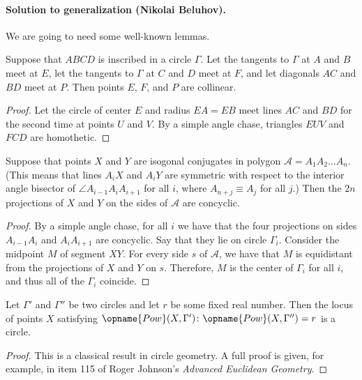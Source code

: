 \paragraph{Solution to generalization (Nikolai Beluhov).}
We are going to need some well-known lemmas.

\begin{lemma*}
Suppose that $ABCD$ is inscribed in a circle $\Gamma$.
Let the tangents to $\Gamma$ at $A$ and $B$ meet at $E$,
let the tangents to $\Gamma$ at $C$ and $D$ meet at $F$,
and let diagonals $AC$ and $BD$ meet at $P$.
Then points $E$, $F$, and $P$ are collinear.
\end{lemma*}

\begin{proof}
Let the circle of center $E$ and radius $EA = EB$
meet lines $AC$ and $BD$ for the second time at points $U$ and $V$.
By a simple angle chase, triangles $EUV$ and $FCD$ are homothetic.
\end{proof}

\begin{lemma*}
Suppose that points $X$ and $Y$ are isogonal conjugates
in polygon $\mathcal{A} = A_1A_2 \dots A_n$.
(This means that lines $A_iX$ and $A_iY$
are symmetric with respect to the interior angle bisector of
$\angle A_{i - 1}A_iA_{i + 1}$ for all $i$,
where $A_{n + j} \equiv A_j$ for all $j$.)
Then the $2n$ projections of $X$ and $Y$ on the sides of $\mathcal{A}$ are concyclic.
\end{lemma*}

\begin{proof}
By a simple angle chase, for all $i$ we have that
the four projections on sides
$A_{i - 1}A_i$ and $A_iA_{i + 1}$ are concyclic.
Say that they lie on circle $\Gamma_i$.
Consider the midpoint $M$ of segment $XY$.
For every side $s$ of $\mathcal{A}$,
we have that $M$ is equidistant from the projections of $X$ and $Y$ on $s$.
Therefore, $M$ is the center of $\Gamma_i$ for all $i$,
and thus all of the $\Gamma_i$ coincide.
\end{proof}

\begin{lemma*}
Let $\Gamma'$ and $\Gamma''$ be two circles
and let $r$ be some fixed real number.
Then the locus of points $X$ satisfying
$\opname{Pow}(X, \Gamma') \colon \opname{Pow}(X, \Gamma'') = r$
is a circle.
\end{lemma*}

\begin{proof}
This is a classical result in circle geometry.
A full proof is given, for example,
in item 115 of Roger Johnson's \emph{Advanced Euclidean Geometry}.
\end{proof}



